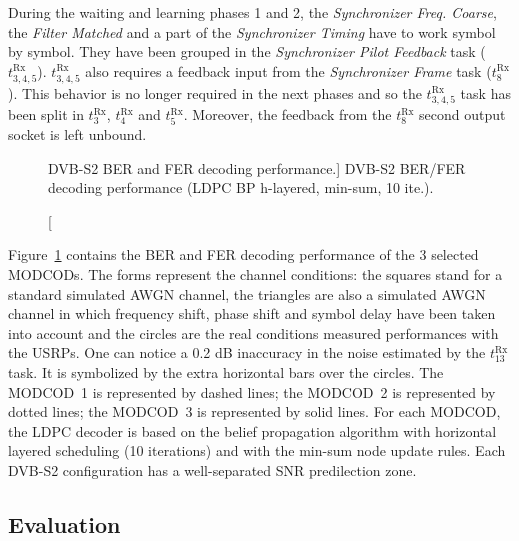 During the waiting and learning phases 1 and 2, the \emph{Synchronizer Freq.
Coarse}, the \emph{Filter Matched} and a part of the \emph{Synchronizer Timing}
have to work symbol by symbol. They have been grouped in the \emph{Synchronizer
Pilot Feedback} task ($t^\text{Rx}_{3,4,5}$). $t^\text{Rx}_{3,4,5}$ also
requires a feedback input from the \emph{Synchronizer Frame} task
($t^\text{Rx}_8$). This behavior is no longer required in the next phases and so
the $t^\text{Rx}_{3,4,5}$ task has been split in $t^\text{Rx}_3$,
$t^\text{Rx}_4$ and $t^\text{Rx}_5$. Moreover, the feedback from the
$t^\text{Rx}_8$ second output socket is left unbound.

\begin{figure}[htp]
  \centering
  \caption
    [DVB-S2 BER and FER decoding performance.]
    {DVB-S2 BER/FER decoding performance (LDPC BP h-layered, min-sum, 10 ite.).}
  \label{fig:sdr_dvbs2_bfer}
\end{figure}

Figure~\ref{fig:sdr_dvbs2_bfer} contains the BER and FER decoding performance of
the 3 selected MODCODs. The forms represent the channel conditions: the squares
stand for a standard simulated AWGN channel, the triangles are also a simulated
AWGN channel in which frequency shift, phase shift and symbol delay have been
taken into account and the circles are the real conditions measured performances
with the USRPs. One can notice a 0.2 dB inaccuracy in the noise estimated by the
$t^\text{Rx}_{13}$ task. It is symbolized by the extra horizontal bars over
the circles. The {\color{Paired-1} MODCOD~1} is represented by dashed lines; the
{\color{Paired-3} MODCOD~2} is represented by dotted lines; the
{\color{Paired-5} MODCOD~3} is represented by solid lines. For each MODCOD, the
LDPC decoder is based on the belief propagation algorithm with horizontal
layered scheduling (10 iterations) and with the min-sum node update rules. Each
DVB-S2 configuration has a well-separated SNR predilection zone.

\subsection{Evaluation}


